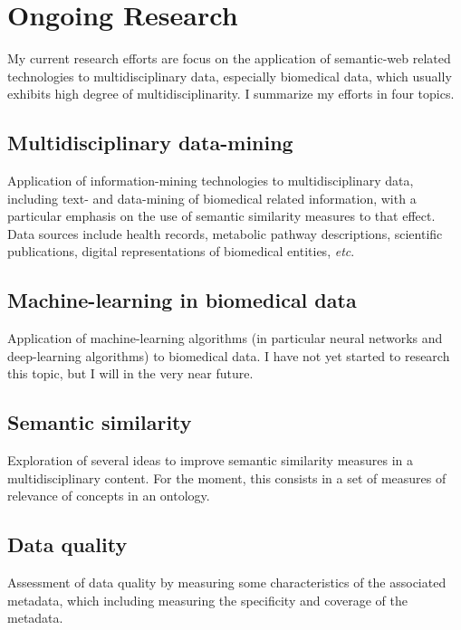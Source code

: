 \section{Ongoing Research}

My current research efforts are focus on the application of semantic-web related technologies to multidisciplinary data, especially biomedical data, which usually exhibits high degree of multidisciplinarity. I summarize my efforts in four topics.

\subsection{Multidisciplinary data-mining}

Application of information-mining technologies to multidisciplinary data, including text- and data-mining of biomedical related information, with a particular emphasis on the use of semantic similarity measures to that effect. Data sources include health records, metabolic pathway descriptions, scientific publications, digital representations of biomedical entities, \emph{etc}.


\subsection{Machine-learning in biomedical data}

Application of machine-learning algorithms (in particular neural networks and deep-learning algorithms) to biomedical data. I have not yet started to research this topic, but I will in the very near future.


\subsection{Semantic similarity}

Exploration of several ideas to improve semantic similarity measures in a multidisciplinary content. For the moment, this consists in a set of measures of relevance of concepts in an ontology.


\subsection{Data quality}

Assessment of data quality by measuring some characteristics of the associated metadata, which including measuring the specificity and coverage of the metadata.
